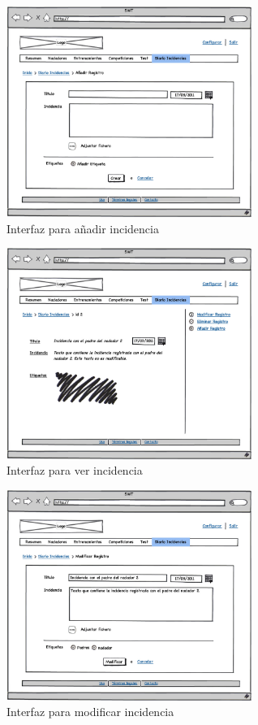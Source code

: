 		\begin{figure}[H]
		  \centering
		    \includegraphics[width=8cm]{./eps/p_interfaz/23_Diario_new.eps}
		  \caption{Interfaz para añadir incidencia}
		  \label{fig:interfaz_incidencias_new}
		\end{figure}
		
		\begin{figure}[H]
		  \centering
		    \includegraphics[width=8cm]{./eps/p_interfaz/24_Diario_show.eps}
		  \caption{Interfaz para ver incidencia}
		  \label{fig:interfaz_incidencias_show}
		\end{figure}

		\begin{figure}[H]
		  \centering
		    \includegraphics[width=8cm]{./eps/p_interfaz/25_Diario_modif.eps}
		  \caption{Interfaz para modificar incidencia}
		  \label{fig:interfaz_incidencias_modif}
		\end{figure}

